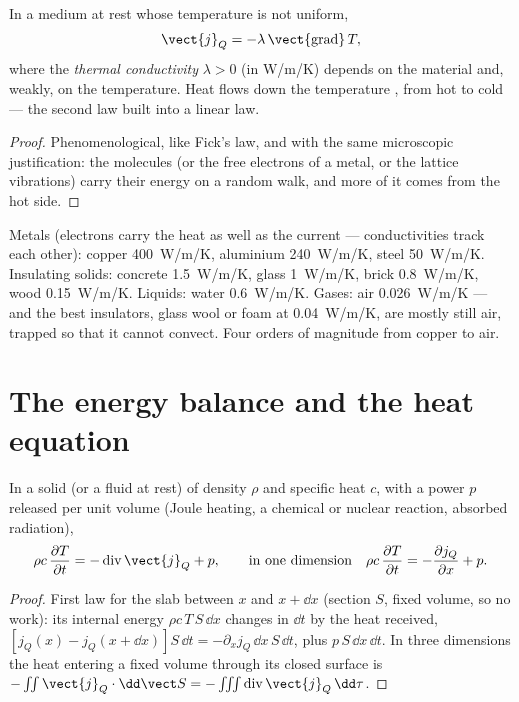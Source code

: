 \begin{theorem}\label{thm:b2:heat-conduction:fourier}
In a medium at rest whose temperature is not uniform,
\[
\vect{j}_Q = -\lambda\,\vect{\operatorname{grad}}\,T ,
\]
where the \emph{thermal conductivity}
$\lambda > 0$ (in \unit{W/m/K}) depends on the material and, weakly, on
the temperature. Heat flows down the temperature , from hot to
cold --- the second law built into a linear law.
\end{theorem}

\begin{proof}
Phenomenological, like Fick's law, and with the same microscopic
justification: the molecules (or the free electrons of a metal, or the
lattice vibrations) carry their energy on a random walk, and more of
it comes from the hot side.
\end{proof}

\begin{example}[Conductivities]\label{ex:b2:heat-conduction:values}
Metals (electrons carry the heat as well as the current ---
conductivities track each other): copper \qty{400}{W/m/K}, aluminium
\qty{240}{W/m/K}, steel \qty{50}{W/m/K}. Insulating solids: concrete
\qty{1.5}{W/m/K}, glass \qty{1}{W/m/K}, brick \qty{0.8}{W/m/K}, wood
\qty{0.15}{W/m/K}. Liquids: water \qty{0.6}{W/m/K}. Gases: air
\qty{0.026}{W/m/K} --- and the best insulators, glass wool or foam at
\qty{0.04}{W/m/K}, are mostly still air, trapped so that it cannot
convect. Four orders of magnitude from copper to air.
\end{example}

\section{The energy balance and the heat equation}

\begin{theorem}\label{thm:b2:heat-conduction:balance}
In a solid (or a fluid at rest) of density $\rho$ and specific heat
$c$, with a power $p$ released per unit volume (Joule heating, a
chemical or nuclear reaction, absorbed radiation),
\[
\rho c\,\frac{\partial T}{\partial t} = -\operatorname{div}\vect{j}_Q + p ,
\qquad\text{in one dimension}\quad
\rho c\,\frac{\partial T}{\partial t} = -\frac{\partial j_Q}{\partial x} + p .
\]
\end{theorem}

\begin{proof}
First law for the slab between $x$ and $x + \dd x$ (section $S$,
fixed volume, so no work): its internal energy $\rho c\,T\,S\,\dd x$
changes in $\dd t$ by the heat received, $[j_Q(x) - j_Q(x+\dd x)]S\,\dd t
= -\partial_x j_Q\,\dd x\,S\,\dd t$, plus $p\,S\,\dd x\,\dd t$. In three
dimensions the heat entering a fixed volume through its closed surface
is $-\iint\vect{j}_Q\cdot\dd\vect S = -\iiint\operatorname{div}\vect{j}_Q\,\dd\tau$.
\end{proof}

